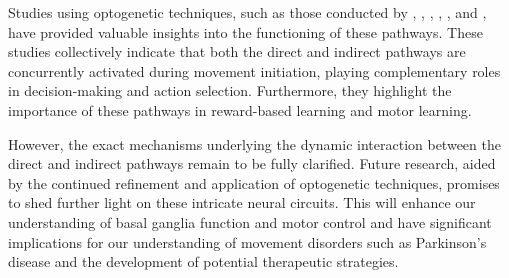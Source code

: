 \documentclass[10pt]{article}
\begin{document}
\begin{sloppypar}
  Studies using optogenetic techniques, such as those conducted by \cite{cui_concurrent_2013}, \cite{kravitz_regulation_2010}, \cite{yttri_opponent_2016}, \cite{guillaumin_optogenetic_2020}, \cite{hilt_evidence_2016}, and \cite{wang_direct_2015}, have provided valuable insights into the functioning of these pathways. These studies collectively indicate that both the direct and indirect pathways are concurrently activated during movement initiation, playing complementary roles in decision-making and action selection. Furthermore, they highlight the importance of these pathways in reward-based learning and motor learning.

  However, the exact mechanisms underlying the dynamic interaction between the direct and indirect pathways remain to be fully clarified. Future research, aided by the continued refinement and application of optogenetic techniques, promises to shed further light on these intricate neural circuits. This will enhance our understanding of basal ganglia function and motor control and have significant implications for our understanding of movement disorders such as Parkinson’s disease and the development of potential therapeutic strategies.

  \pagebreak
  \singlespacing %
  
  

\end{sloppypar}
\end{document}
